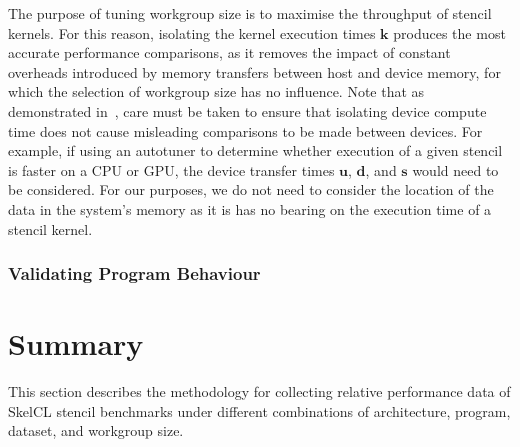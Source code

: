 %
The purpose of tuning workgroup size is to maximise the throughput of
stencil kernels. For this reason, isolating the kernel execution times
$\bm{k}$ produces the most accurate performance comparisons, as it
removes the impact of constant overheads introduced by memory
transfers between host and device memory, for which the selection of
workgroup size has no influence. Note that as demonstrated
in~\cite{Gregg2011}, care must be taken to ensure that isolating
device compute time does not cause misleading comparisons to be made
between devices. For example, if using an autotuner to determine
whether execution of a given stencil is faster on a CPU or GPU, the
device transfer times $\bm{u}$, $\bm{d}$, and $\bm{s}$ would need to
be considered. For our purposes, we do not need to consider the
location of the data in the system's memory as it is has no bearing on
the execution time of a stencil kernel.


\subsubsection{Validating Program Behaviour}



\section{Summary}

This section describes the methodology for collecting relative
performance data of SkelCL stencil benchmarks under different
combinations of architecture, program, dataset, and workgroup size.
